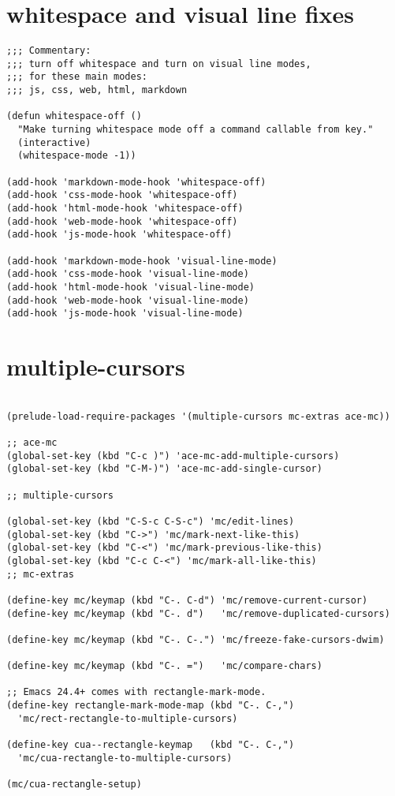 \documentclass[11pt]{article}
\begin{document}
\section{whitespace and visual line fixes}
\label{sec:orgd80f180}

\begin{verbatim}
;;; Commentary:
;;; turn off whitespace and turn on visual line modes,
;;; for these main modes:
;;; js, css, web, html, markdown

(defun whitespace-off ()
  "Make turning whitespace mode off a command callable from key."
  (interactive)
  (whitespace-mode -1))

(add-hook 'markdown-mode-hook 'whitespace-off)
(add-hook 'css-mode-hook 'whitespace-off)
(add-hook 'html-mode-hook 'whitespace-off)
(add-hook 'web-mode-hook 'whitespace-off)
(add-hook 'js-mode-hook 'whitespace-off)

(add-hook 'markdown-mode-hook 'visual-line-mode)
(add-hook 'css-mode-hook 'visual-line-mode)
(add-hook 'html-mode-hook 'visual-line-mode)
(add-hook 'web-mode-hook 'visual-line-mode)
(add-hook 'js-mode-hook 'visual-line-mode)

\end{verbatim}
\section{multiple-cursors}
\label{sec:org221672f}

\begin{verbatim}

(prelude-load-require-packages '(multiple-cursors mc-extras ace-mc))

;; ace-mc
(global-set-key (kbd "C-c )") 'ace-mc-add-multiple-cursors)
(global-set-key (kbd "C-M-)") 'ace-mc-add-single-cursor)

;; multiple-cursors

(global-set-key (kbd "C-S-c C-S-c") 'mc/edit-lines)
(global-set-key (kbd "C->") 'mc/mark-next-like-this)
(global-set-key (kbd "C-<") 'mc/mark-previous-like-this)
(global-set-key (kbd "C-c C-<") 'mc/mark-all-like-this)
;; mc-extras

(define-key mc/keymap (kbd "C-. C-d") 'mc/remove-current-cursor)
(define-key mc/keymap (kbd "C-. d")   'mc/remove-duplicated-cursors)

(define-key mc/keymap (kbd "C-. C-.") 'mc/freeze-fake-cursors-dwim)

(define-key mc/keymap (kbd "C-. =")   'mc/compare-chars)

;; Emacs 24.4+ comes with rectangle-mark-mode.
(define-key rectangle-mark-mode-map (kbd "C-. C-,")
  'mc/rect-rectangle-to-multiple-cursors)

(define-key cua--rectangle-keymap   (kbd "C-. C-,")
  'mc/cua-rectangle-to-multiple-cursors)

(mc/cua-rectangle-setup)
\end{verbatim}
\end{document}
